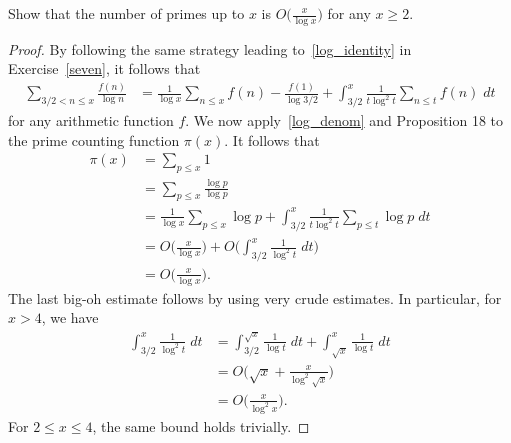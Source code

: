 \documentclass[11pt]{article}
\newenvironment{ex}[1]
  {\renewcommand\theinnercustomthm{#1}\innercustomthm}
  {\endinnercustomthm}
\begin{document}

\begin{ex}{20}\label{twenty}
Show that the number of primes up to $x$ is $O\big(\frac{x}{\log{x}}\big)$ for any $x\geq 2$.
\end{ex}

\begin{proof}
By following the same strategy leading to~\eqref{log_identity} in Exercise~\ref{seven}, it follows that
\begin{align}
\sum_{3/2< n\leq x} \frac{f(n)}{\log{n}} &= \frac{1}{\log{x}}\sum_{n\leq x}f(n)-\frac{f(1)}{\log{3/2}}+\int_{3/2}^x\frac{1}{t\log^2{t}}\sum_{n\leq t} f(n)\;dt\label{log_denom}
\end{align}
for any arithmetic function $f$. We now apply~\eqref{log_denom} and Proposition 18 to the prime counting function $\pi(x)$. It follows that
\begin{align*}
\pi(x) &= \sum_{p\leq x} 1\\
&= \sum_{p\leq x} \frac{\log{p}}{\log{p}}\\
&= \frac{1}{\log{x}}\sum_{p\leq x}\log{p}+\int_{3/2}^x\frac{1}{t\log^2{t}}\sum_{p\leq t} \log{p}\;dt\\
&= O\bigg(\frac{x}{\log{x}}\bigg)+O\bigg(\int_{3/2}^x\frac{1}{\log^2{t}}\;dt\bigg)\\
&= O\bigg(\frac{x}{\log{x}}\bigg).
\end{align*}
The last big-oh estimate follows by using very crude estimates. In particular, for $x>4$, we have
\begin{align*}
\int_{3/2}^x\frac{1}{\log^2{t}}\;dt &= \int_{3/2}^{\sqrt{x}}\frac{1}{\log{t}}\;dt+\int_{\sqrt{x}}^x\frac{1}{\log{t}}\;dt\\
&= O\bigg(\sqrt{x}+\frac{x}{\log^2{\sqrt{x}}}\bigg)\\
&= O\bigg(\frac{x}{\log^2{x}}\bigg).
\end{align*}
For $2\leq x\leq 4$, the same bound holds trivially. 
\end{proof}

\end{document}
